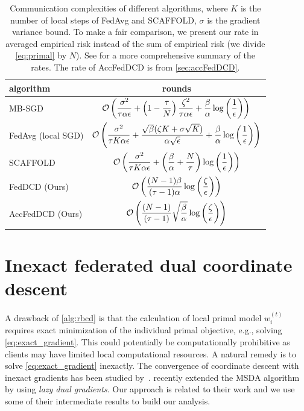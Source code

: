\begin{table}[t]
    \small
    \centering
    \begin{tabular}{lc}    
    \toprule 
    algorithm & rounds  \\
    \midrule
    MB-SGD & $\displaystyle \mathcal{O} \left( \frac{\sigma^2}{\tau \alpha \epsilon}  + \left( 1 - \frac{\tau}{N} \right) \frac{\zeta^2}{\tau \alpha \epsilon} + \frac{\beta}{\alpha} \log\left(\frac{1}{\epsilon}\right) \right) $ \\ 
    FedAvg (local SGD) & $\displaystyle \mathcal{O} \left( \frac{\sigma^2}{\tau K \alpha \epsilon} + \frac{\sqrt{\beta}( \zeta K + \sigma \sqrt{K} ) }{\alpha \sqrt{\epsilon}} + \frac{\beta}{\alpha} \log\left(\frac{1}{\epsilon}\right) \right)$  \\
    SCAFFOLD & $\displaystyle \mathcal{O} \left( \frac{\sigma^2}{\tau K \alpha \epsilon}  + \left(\frac{\beta}{\alpha} +\frac{N}{\tau} \right)\log\left(\frac{1}{\epsilon}\right) \right) $  \\
    FedDCD (Ours)& $\displaystyle \mathcal{O}\left( \frac{(N-1) \beta}{(\tau-1) \alpha} \log\left( \frac{\zeta}{ \epsilon } \right) \right)$ \\
    AccFedDCD (Ours)& $\displaystyle \mathcal{O}\left( \frac{(N-1) }{(\tau-1) } \sqrt{ \frac{\beta}{\alpha} } \log\left( \frac{\zeta}{ \epsilon } \right) \right)$ \\
    \bottomrule 
    \end{tabular}
    \caption{Communication complexities of different algorithms, where $K$ is the number of local steps of FedAvg and SCAFFOLD, $\sigma$ is the gradient variance bound. To make a fair comparison, we present our rate in averaged empirical risk instead of the sum of empirical risk (we divide \autoref{eq:primal} by $N$). See \citet{WoodworthPS20} for a more comprehensive summary of the rates. The rate of AccFedDCD is from \autoref{sec:accFedDCD}.}
    \label{tab:communicationComplexity}
\end{table}

\section{Inexact federated dual coordinate descent}
\label{sec:inexactFedDCD}
A drawback of \autoref{alg:rbcd} is that the calculation of local primal model $w_i^{(t)}$ requires exact minimization of the individual primal objective, e.g., solving \eqref{eq:exact_gradient}. This could potentially be computationally prohibitive as clients may have limited local computational resources. 
A natural remedy is to solve \eqref{eq:exact_gradient} inexactly. The convergence of coordinate descent with inexact gradients has been studied by~\citet{CassioliLS13,TappendenRG16,LiuSY21}. \citet{LiuSY21} recently extended the MSDA algorithm~\citep{Scaman2017OptimalAF} by using \emph{lazy dual gradients}. Our approach is related to their work and we use some of their intermediate results to build our analysis. 

